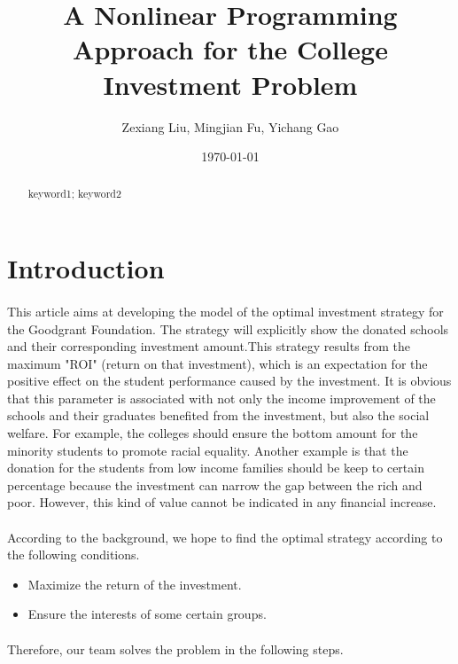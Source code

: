 \documentclass{mcmthesis}
\title{A Nonlinear Programming Approach for the College Investment Problem}
\author{Zexiang Liu, Mingjian Fu, Yichang Gao}
\date{\today}
\begin{document}
\begin{abstract}
\lipsum[1-2]

\begin{keywords}
keyword1; keyword2
\end{keywords}
\end{abstract}

\maketitle

\tableofcontents

\newpage

\section{Introduction}
\paragraph{} This article aims at developing the model of the optimal investment strategy for the Goodgrant Foundation. The strategy will explicitly show the donated schools and their corresponding investment amount.This strategy results from the maximum "ROI" (return on that investment), which is an expectation for the positive effect on the student performance caused by the investment. It is obvious that this parameter is associated with not only the income improvement of the schools and their graduates benefited from the investment, but also the social welfare. For example, the colleges should ensure the bottom amount for the minority students to promote racial equality. Another example is that the donation for the students from low income families should be keep to certain percentage because the investment can narrow the gap between the rich and poor. However, this kind of value cannot be indicated in any financial increase.
\paragraph{} According to the background, we hope to find the optimal strategy according to the following conditions.
\begin{itemize}
\item Maximize the return of the investment.
\item Ensure the interests of some certain groups.
\end{itemize}
\paragraph{} Therefore, our team solves the problem in the following steps.
\end{document}
